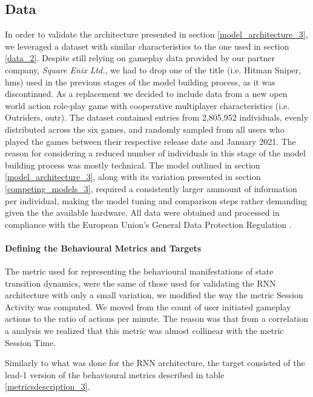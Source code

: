 \subsection{Data}
\label{data_3}
In order to validate the architecture presented in section \ref{model_architecture_3}, we leveraged a dataset with similar characteristics to the one used in section \ref{data_2}. Despite still relying on gameplay data provided by our partner company, \textit{Square Enix Ltd.}, we had to drop one of the title (i.e. Hitman Sniper, hms) used in the previous stages of the model building process, as it was discontinued. As a replacement we decided to include data from a new open world action role-play game with cooperative multiplayer characteristics (i.e. Outriders, outr). The dataset contained entries from 2,805,952 individuals, evenly distributed across the six games, and randomly sampled from all users who played the games between their respective release date and January 2021. The reason for considering a reduced number of individuals in this stage of the model building process was mostly technical. The model outlined in section \ref{model_architecture_3}, along with its variation presented in section \ref{competing_models_3}, required a consistently larger ammount of information per individual, making the model tuning and comparison steps rather demanding given the the available hardware. All data were obtained and processed in compliance with the European Union's General Data Protection Regulation \cite{EUdataregulations2018}. 


\paragraph*{Defining the Behavioural Metrics and Targets}
The metric used for representing the behavioural manifestations of state transition dynamics, were the same 
of those used for validating the RNN architecture with only a small variation,  we modified the way the metric Session Activity was computed. We moved from the count of user initiated gameplay actions to the ratio of actions per minute. The reason was that from a correlation a analysis we realized that this metric was almost collinear with the metric Session Time.

Similarly to what was done for the RNN architecture, the target consisted of the lead-1 version of the behavioural metrics described in table \ref{metricsdescription_3}.

